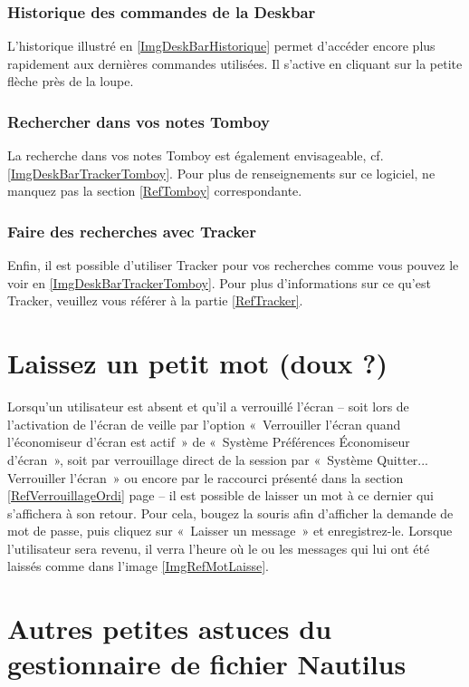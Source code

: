 \subsubsection{Historique des commandes de la Deskbar}
L'historique illustré en \ref{ImgDeskBarHistorique} permet d'accéder encore plus rapidement aux dernières commandes utilisées. Il s'active en cliquant sur la petite flèche près de la loupe.
\DeskBarPartieDeux
\afterpage{\clearpage}
\subsubsection{Rechercher dans vos notes Tomboy}
La recherche dans vos notes Tomboy est également envisageable, cf. \ref{ImgDeskBarTrackerTomboy}. Pour plus de renseignements sur ce logiciel, ne manquez pas la section \ref{RefTomboy} correspondante.
\subsubsection{Faire des recherches avec Tracker}
Enfin, il est possible d'utiliser Tracker pour vos recherches comme vous pouvez le voir en \ref{ImgDeskBarTrackerTomboy}. Pour plus d'informations sur ce qu'est Tracker, veuillez vous référer à la partie \ref{RefTracker}.
\section{Laissez un petit mot (doux ?)}
Lorsqu'un utilisateur est absent et qu'il a verrouillé l'écran -- soit lors de l'activation de l'écran de veille par l'option «~Verrouiller l'écran quand l'économiseur d'écran est actif~» de «~Système \FlecheDroite Préférences \FlecheDroite Économiseur d'écran~», soit par verrouillage direct de la session par «~Système \FlecheDroite Quitter... \FlecheDroite Verrouiller l'écran~» ou encore par le raccourci présenté dans la section \ref{RefVerrouillageOrdi} page \pageref{RefVerrouillageOrdi} -- il est possible de laisser un mot à ce dernier qui s'affichera à son retour. Pour cela, bougez la souris afin d'afficher la demande de mot de passe, puis cliquez sur «~Laisser un message~» et enregistrez-le. Lorsque l'utilisateur sera revenu, il verra l'heure où le ou les messages qui lui ont été laissés comme dans l'image \ref{ImgRefMotLaisse}.
\section{Autres petites astuces du gestionnaire de fichier Nautilus}
